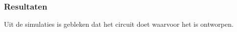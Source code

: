 \subsubsection{Resultaten}
Uit de simulaties is gebleken dat het circuit doet waarvoor het is ontworpen.
